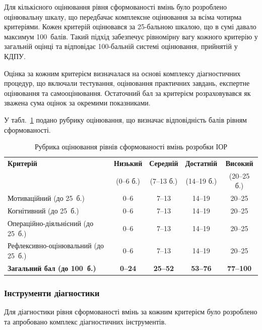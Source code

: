 Для кількісного оцінювання рівня сформованості вмінь було розроблено оцінювальну шкалу, що передбачає комплексне оцінювання за всіма чотирма критеріями. Кожен критерій оцінювався за 25-бальною шкалою, що в сумі давало максимум 100~балів. Такий підхід забезпечує рівномірну вагу кожного критерію у загальній оцінці та відповідає 100-бальній системі оцінювання, прийнятій у КДПУ.

Оцінка за кожним критерієм визначалася на основі комплексу діагностичних процедур, що включали тестування, оцінювання практичних завдань, експертне оцінювання та самооцінювання. Остаточний бал за критерієм розраховувався як зважена сума оцінок за окремими показниками.

У табл.~\ref{tab:assessment_rubric} подано рубрику оцінювання, що визначає відповідність балів рівням сформованості.

\begin{table}[htbp]
\centering
\caption{Рубрика оцінювання рівнів сформованості вмінь розробки ІОР}
\label{tab:assessment_rubric}
\small
\begin{tabular}{|p{3.5cm}|c|c|c|c|}
\hline
\textbf{Критерій} & \textbf{Низький} & \textbf{Середній} & \textbf{Достатній} & \textbf{Високий} \\
 & (0--6 б.) & (7--13 б.) & (14--19 б.) & (20--25 б.) \\
\hline
Мотиваційний (до 25~б.) & 0--6 & 7--13 & 14--19 & 20--25 \\
\hline
Когнітивний (до 25~б.) & 0--6 & 7--13 & 14--19 & 20--25 \\
\hline
Операційно-діяльнісний (до 25~б.) & 0--6 & 7--13 & 14--19 & 20--25 \\
\hline
Рефлексивно-оцінювальний (до 25~б.) & 0--6 & 7--13 & 14--19 & 20--25 \\
\hline
\textbf{Загальний бал (до 100~б.)} & \textbf{0--24} & \textbf{25--52} & \textbf{53--76} & \textbf{77--100} \\
\hline
\end{tabular}
\end{table}

\subsubsection{Інструменти діагностики}

Для діагностики рівня сформованості вмінь за кожним критерієм було розроблено та апробовано комплекс діагностичних інструментів.

